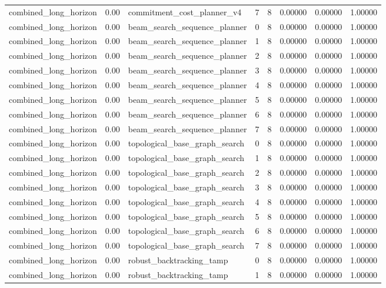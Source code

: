\documentclass{article}
\begin{document}
\begin{table}[tbp]
{\begin{tabular}{llllllll}
combined\_long\_horizon & 0.00 & commitment\_cost\_planner\_v4 & 7 & 8 & 0.00000 & 0.00000 & 1.00000 \\
combined\_long\_horizon & 0.00 & beam\_search\_sequence\_planner & 0 & 8 & 0.00000 & 0.00000 & 1.00000 \\
combined\_long\_horizon & 0.00 & beam\_search\_sequence\_planner & 1 & 8 & 0.00000 & 0.00000 & 1.00000 \\
combined\_long\_horizon & 0.00 & beam\_search\_sequence\_planner & 2 & 8 & 0.00000 & 0.00000 & 1.00000 \\
combined\_long\_horizon & 0.00 & beam\_search\_sequence\_planner & 3 & 8 & 0.00000 & 0.00000 & 1.00000 \\
combined\_long\_horizon & 0.00 & beam\_search\_sequence\_planner & 4 & 8 & 0.00000 & 0.00000 & 1.00000 \\
combined\_long\_horizon & 0.00 & beam\_search\_sequence\_planner & 5 & 8 & 0.00000 & 0.00000 & 1.00000 \\
combined\_long\_horizon & 0.00 & beam\_search\_sequence\_planner & 6 & 8 & 0.00000 & 0.00000 & 1.00000 \\
combined\_long\_horizon & 0.00 & beam\_search\_sequence\_planner & 7 & 8 & 0.00000 & 0.00000 & 1.00000 \\
combined\_long\_horizon & 0.00 & topological\_base\_graph\_search & 0 & 8 & 0.00000 & 0.00000 & 1.00000 \\
combined\_long\_horizon & 0.00 & topological\_base\_graph\_search & 1 & 8 & 0.00000 & 0.00000 & 1.00000 \\
combined\_long\_horizon & 0.00 & topological\_base\_graph\_search & 2 & 8 & 0.00000 & 0.00000 & 1.00000 \\
combined\_long\_horizon & 0.00 & topological\_base\_graph\_search & 3 & 8 & 0.00000 & 0.00000 & 1.00000 \\
combined\_long\_horizon & 0.00 & topological\_base\_graph\_search & 4 & 8 & 0.00000 & 0.00000 & 1.00000 \\
combined\_long\_horizon & 0.00 & topological\_base\_graph\_search & 5 & 8 & 0.00000 & 0.00000 & 1.00000 \\
combined\_long\_horizon & 0.00 & topological\_base\_graph\_search & 6 & 8 & 0.00000 & 0.00000 & 1.00000 \\
combined\_long\_horizon & 0.00 & topological\_base\_graph\_search & 7 & 8 & 0.00000 & 0.00000 & 1.00000 \\
combined\_long\_horizon & 0.00 & robust\_backtracking\_tamp & 0 & 8 & 0.00000 & 0.00000 & 1.00000 \\
combined\_long\_horizon & 0.00 & robust\_backtracking\_tamp & 1 & 8 & 0.00000 & 0.00000 & 1.00000 \\
\bottomrule
\end{tabular}
}
\end{table}
\end{document}
